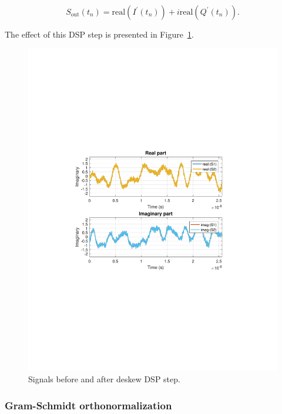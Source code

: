 \begin{equation}
S_\text{out}(t_n)=\text{real}(I^\prime(t_n))+i\text{real}(Q^\prime(t_n)).
\end{equation}
\par
The effect of this DSP step is presented in Figure~\ref{fig:S2}.
%
\begin{figure}[h]
\centering
\includegraphics[trim={7cm 8cm 7cm 8cm},width=.3\linewidth]{./sdf/m_qam_system/figures/DSP_section/S2}
\caption{Signals before and after deskew DSP step.}
\label{fig:S2}
\end{figure}	
%

\subsubsection{Gram-Schmidt orthonormalization}

